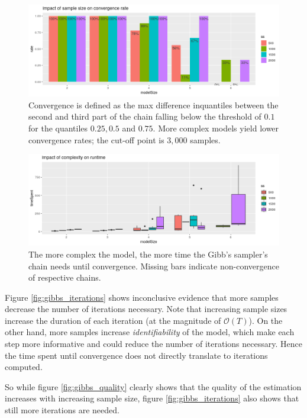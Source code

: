 \begin{figure}
	\includegraphics[width=\linewidth]{img/sim_bern_gibbs_convergence.png}
	\caption{Convergence is defined as the max difference inquantiles between the second and third part of the chain falling below the threshold of $0.1$ for the quantiles $0.25, 0.5$ and $0.75$. More complex models yield lower convergence rates; the cut-off point is $3,000$ samples. }
	\label{fig:gibbs_convergence}
\end{figure}


\begin{figure}
	\includegraphics[width=\linewidth]{img/sim_bern_gibbs_runtime.png}
	\caption{The more complex the model, the more time the Gibb's sampler's chain needs until convergence. Missing bars indicate non-convergence of respective chains. }
	\label{fig:gibbs_runtime}
\end{figure}


Figure \ref{fig:gibbs_iterations} shows inconclusive evidence that more samples decrease the number of iterations necessary. 
Note that increasing sample sizes increase the duration of each iteration (at the magnitude of $\mathcal{O}(T)$). On the other hand, more samples increase \textit{identifiability} of the model, which make each step more informative and could reduce the number of iterations necessary. Hence the time spent until convergence does not directly translate to iterations computed.


So while figure \ref{fig:gibbs_quality} clearly shows that the quality of the estimation increases with increasing sample size, figure \ref{fig:gibbs_iterations} also shows that still more iterations are needed. 


